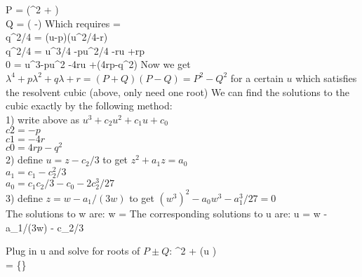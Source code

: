 \documentclass[aps,prl,twocolumn,showpacs,amsmath,amssymb]{revtex4-1}
\begin{document}
 \bea
 P = (\lambda^2 + ) \\
 Q =  \bigg( \lambda -\bigg)
  \eea
  Which requires
  \bea
   =  \\
  q^2/4 = (u-p)(u^2/4-r)  \\
  q^2/4 = u^3/4 -pu^2/4 -ru +rp \\
  0 = u^3-pu^2 -4ru +(4rp-q^2)
  \eea
 Now we get $\lambda^4 + p \lambda^2 + q \lambda + r = (P+Q)(P-Q)  = P^2 - Q^2$ for a certain $u$ which satisfies the resolvent cubic (above, only need one root)
 We can find the solutions to the cubic exactly by the following method: \\
 1)	write above as $u^3 + c_2 u^2 + c_1 u + c_0$ \\
 	$c2 = -p$ \\
	$c1 = -4r$\\
	$c0 = 4rp - q^2$\\
 2)	define $u = z-c_2/3$ to get $z^2 + a_1z = a_0$ \\
	$ a_1 = c_1 -  c_2^2/3$ \\
	$a_0  = c_1c_2/3 - c_0 - 2c_2^3/27$ \\
 3)	define $ z = w - a_1/(3w)$ to get $(w^3)^2 - a_0w^3 - a_1^3/27 = 0$ \\
 The solutions to w are:
 \bea
 w = 
 \eea
 The corresponding solutions to u are:
 \bea
 u = w - a_1/(3w) - c_2/3
 \eea
 
 
 

Plug in u and solve for roots of $P\pm Q$:
\bea
\lambda^2 \pm {}\lambda + \bigg(u \bigg) \\
\lambda = \pm{} \{\pm\} 
\eea
\end{document}
